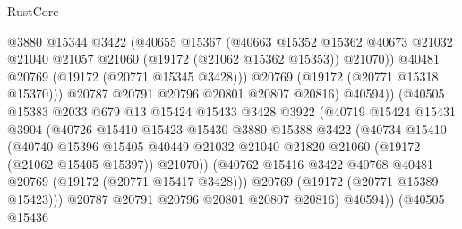\begin{lexlean}{RustCore}
\begin{coremodule}
                              @3880
                              @15344
                              @3422
                              (@40655
                                @15367
                                (@40663
                                  @15352
                                  @15362
                                  @40673
                                  @21032
                                  @21040
                                  @21057
                                  @21060
                                  (@19172 (@21062 @15362 @15353))
                                  @21070))
                              @40481
                              @20769
                              (@19172 (@20771 @15345 @3428)))
                            @20769
                            (@19172 (@20771 @15318 @15370)))
                          @20787
                          @20791
                          @20796
                          @20801
                          @20807
                          @20816)
                        @40594))
                    (@40505
                      @15383
                      @2033
                      @679
                      @13
                      @15424
                      @15433
                      @3428
                      @3922
                      (@40719
                        @15424
                        @15431
                        @3904
                        (@40726
                          @15410
                          @15423
                          @15430
                          @3880
                          @15388
                          @3422
                          (@40734
                            @15410
                            (@40740
                              @15396
                              @15405
                              @40449
                              @21032
                              @21040
                              @21820
                              @21060
                              (@19172 (@21062 @15405 @15397))
                              @21070))
                          (@40762 @15416 @3422 @40768 @40481 @20769 (@19172 (@20771 @15417 @3428)))
                          @20769
                          (@19172 (@20771 @15389 @15423)))
                        @20787
                        @20791
                        @20796
                        @20801
                        @20807
                        @20816)
                      @40594))
                  (@40505
                    @15436

\end{coremodule}
\end{lexlean}
